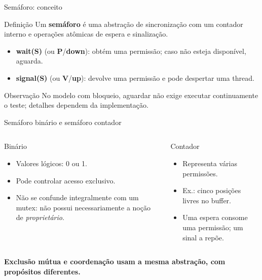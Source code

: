 \documentclass[aspectratio=169,11pt]{beamer}
\begin{document}
\begin{frame}{Semáforo: conceito}
\begin{block}{Definição}
Um \textbf{semáforo} é uma abstração de sincronização com um contador interno e operações atômicas de espera e sinalização.
\end{block}
\begin{itemize}
\item \textbf{wait(S)} (ou \textbf{P}/\textbf{down}): obtém uma permissão; caso não esteja disponível, aguarda.
\item \textbf{signal(S)} (ou \textbf{V}/\textbf{up}): devolve uma permissão e pode despertar uma thread.
\end{itemize}
\vspace{0.2cm}
\begin{alertblock}{Observação}
No modelo com bloqueio, aguardar não exige executar continuamente o teste; detalhes dependem da implementação.
\end{alertblock}
\end{frame}

\begin{frame}{Semáforo binário e semáforo contador}
\begin{columns}[T,onlytextwidth]
\begin{block}{Binário}
\begin{itemize}
\item Valores lógicos: 0 ou 1.
\item Pode controlar acesso exclusivo.
\item Não se confunde integralmente com um mutex: não possui necessariamente a noção de \emph{proprietário}.
\end{itemize}
\end{block}
\begin{block}{Contador}
\begin{itemize}
\item Representa várias permissões.
\item Ex.: cinco posições livres no buffer.
\item Uma espera consome uma permissão; um sinal a repõe.
\end{itemize}
\end{block}
\end{columns}
\vspace{0.3cm}
\centering\textbf{Exclusão mútua e coordenação usam a mesma abstração, com propósitos diferentes.}
\end{frame}
\end{document}
